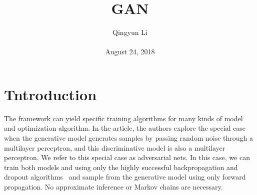 \documentclass[10pt,twocolumn,letterpaper]{article}
\begin{document}
\author{Qingyun Li\\\\
August 24, 2018}        
\title{GAN}

\maketitle

\section{Tntroduction}
\par The  framework can yield specific training algorithms for many kinds of model and optimization algorithm. In the article, the authors explore the special case when the generative model generates samples by passing random noise through a multilayer perceptron, and this discriminative model is also a multilayer perceptron. We refer to this special case as adversarial nets. In this case, we can train both models and using only the highly successful backpropagation and dropout algorithms~\cite{Hinton2012Improving} and sample from the generative model using only forward propagation. No approximate inference or Markov chains are necessary.
\end{document}
